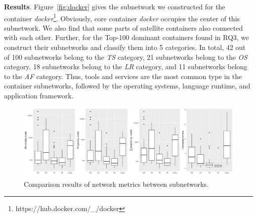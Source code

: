 \documentclass[sigconf]{acmart}
\begin{document}
\noindent\textbf{Results}. 
Figure~\ref{fig:docker} gives the subnetwork we constructed for the container \emph{docker}\footnote{https://hub.docker.com/\_/docker}. 
Obviously, core container \emph{docker} occupies the center of this subnetwork. We also find that some parts of satellite containers also connected with each other. 
Further, for the Top-100 dominant containers found in RQ3, 
we construct their subnetworks and classify them into 5 categories. 
In total, 42 out of 100 subnetworks belong to the \emph{TS} category, 
21 subnetworks belong to the \emph{OS} category, 18 subnetworks belong to the \emph{LR} category, and 11 subnetworks belong to the \emph{AF} category. 
Thus, tools and services are the most common type in the container subnetworks, followed by the operating systems, language runtime, and application framework. 

\begin{figure}[!t]
  \centerline{\includegraphics[width=1\textwidth]{picture/sub_coreimages_netstructre.pdf}}\vspace{-0.3cm}
  \caption{Comparison results of network metrics between subnetworks.}
  \label{fig:diversity}
  \end{figure}
\end{document}
